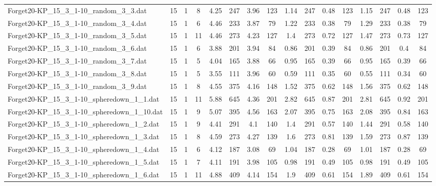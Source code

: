 \begin{sidewaystable}[!ht]
{\begin{tabular}{lccccccccccccccc}
Forget20-KP\_15\_3\_1-10\_random\_3\_3.dat & 15 & 1 & 8 & 4.25 & 247 & 3.96 & 123 & 1.14 & 247 &  \textcolor{blue2}{0.48} & 123 & 1.15 & 247 &  \textcolor{blue2}{0.48} & 123 \\
Forget20-KP\_15\_3\_1-10\_random\_3\_4.dat & 15 & 1 & 6 & 4.46 & 233 & 3.87 & 79 & 1.22 & 233 & 0.38 & 79 & 1.29 & 233 & 0.38 & 79 \\
Forget20-KP\_15\_3\_1-10\_random\_3\_5.dat & 15 & 1 & 11 & 4.46 & 273 & 4.23 & 127 & 1.4 & 273 &  \textcolor{blue2}{0.72} & 127 & 1.47 & 273 & 0.73 & 127 \\
Forget20-KP\_15\_3\_1-10\_random\_3\_6.dat & 15 & 1 & 6 & 3.88 & 201 & 3.94 & 84 & 0.86 & 201 &  \textcolor{blue2}{0.39} & 84 & 0.86 & 201 & 0.4 & 84 \\
Forget20-KP\_15\_3\_1-10\_random\_3\_7.dat & 15 & 1 & 5 & 4.04 & 165 & 3.88 & 66 & 0.95 & 165 & 0.39 & 66 & 0.95 & 165 & 0.39 & 66 \\
Forget20-KP\_15\_3\_1-10\_random\_3\_8.dat & 15 & 1 & 5 & 3.55 & 111 & 3.96 & 60 & 0.59 & 111 & 0.35 & 60 & 0.55 & 111 &  \textcolor{blue2}{0.34} & 60 \\
Forget20-KP\_15\_3\_1-10\_random\_3\_9.dat & 15 & 1 & 8 & 4.55 & 375 & 4.16 & 148 & 1.52 & 375 &  \textcolor{blue2}{0.62} & 148 & 1.56 & 375 &  \textcolor{blue2}{0.62} & 148 \\
Forget20-KP\_15\_3\_1-10\_spheredown\_1\_1.dat & 15 & 1 & 11 & 5.88 & 645 & 4.36 & 201 & 2.82 & 645 &  \textcolor{blue2}{0.87} & 201 & 2.81 & 645 & 0.92 & 201 \\
Forget20-KP\_15\_3\_1-10\_spheredown\_1\_10.dat & 15 & 1 & 9 & 5.07 & 395 & 4.56 & 163 & 2.07 & 395 & 0.75 & 163 & 2.08 & 395 & 0.84 & 163 \\
Forget20-KP\_15\_3\_1-10\_spheredown\_1\_2.dat & 15 & 1 & 9 & 4.41 & 291 & 4.1 & 140 & 1.4 & 291 &  \textcolor{blue2}{0.57} & 140 & 1.44 & 291 & 0.58 & 140 \\
Forget20-KP\_15\_3\_1-10\_spheredown\_1\_3.dat & 15 & 1 & 8 & 4.59 & 273 & 4.27 & 139 & 1.6 & 273 & 0.81 & 139 & 1.59 & 273 & 0.87 & 139 \\
Forget20-KP\_15\_3\_1-10\_spheredown\_1\_4.dat & 15 & 1 & 6 & 4.12 & 187 & 3.08 & 69 & 1.04 & 187 &  \textcolor{blue2}{0.28} & 69 & 1.01 & 187 &  \textcolor{blue2}{0.28} & 69 \\
Forget20-KP\_15\_3\_1-10\_spheredown\_1\_5.dat & 15 & 1 & 7 & 4.11 & 191 & 3.98 & 105 & 0.98 & 191 &  \textcolor{blue2}{0.49} & 105 & 0.98 & 191 &  \textcolor{blue2}{0.49} & 105 \\
Forget20-KP\_15\_3\_1-10\_spheredown\_1\_6.dat & 15 & 1 & 11 & 4.88 & 409 & 4.14 & 154 & 1.9 & 409 &  \textcolor{blue2}{0.61} & 154 & 1.89 & 409 &  \textcolor{blue2}{0.61} & 154 \\

\end{tabular}}
\end{sidewaystable}

